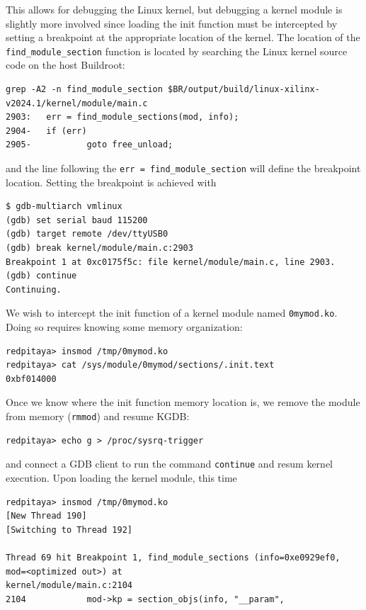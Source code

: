 \documentclass{article}
\begin{document}
{{{This allows for debugging the Linux kernel, but debugging a kernel module is slightly more involved since
loading the init function must be intercepted by setting a breakpoint at the appropriate location of 
the kernel. The location of the {\tt find\_module\_section} function is located by searching the Linux
kernel source code on the host Buildroot:

\noindent
\begin{verbatim}
grep -A2 -n find_module_section $BR/output/build/linux-xilinx-v2024.1/kernel/module/main.c 
2903:   err = find_module_sections(mod, info);
2904-   if (err)
2905-           goto free_unload;
\end{verbatim}

\noindent and the line following the {\tt err = find\_module\_section} will define the breakpoint location. Setting the
breakpoint is achieved with

\begin{verbatim}
$ gdb-multiarch vmlinux 
(gdb) set serial baud 115200
(gdb) target remote /dev/ttyUSB0
(gdb) break kernel/module/main.c:2903
Breakpoint 1 at 0xc0175f5c: file kernel/module/main.c, line 2903.
(gdb) continue
Continuing.
\end{verbatim}

We wish to intercept the init function of a kernel module named {\tt 0mymod.ko}. Doing so requires knowing some
memory organization:

\begin{verbatim}
redpitaya> insmod /tmp/0mymod.ko 
redpitaya> cat /sys/module/0mymod/sections/.init.text 
0xbf014000
\end{verbatim}

Once we know where the init function memory location is, we remove the module from memory ({\tt rmmod}) and resume
KGDB:

\begin{verbatim}
redpitaya> echo g > /proc/sysrq-trigger 
\end{verbatim}

\noindent and connect a GDB client to run the command {\tt continue} and resum kernel execution. Upon loading
the kernel module, this time

\begin{verbatim}
redpitaya> insmod /tmp/0mymod.ko 
[New Thread 190]
[Switching to Thread 192]
 
Thread 69 hit Breakpoint 1, find_module_sections (info=0xe0929ef0, mod=<optimized out>) at
kernel/module/main.c:2104
2104            mod->kp = section_objs(info, "__param",
\end{verbatim}

}}}
\end{document}
